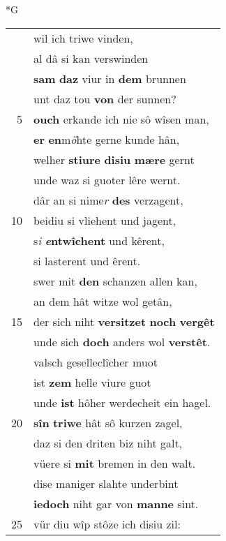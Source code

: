 \documentclass[8pt,a4paper,notitlepage]{article}
\begin{document}
\begin{table}[ht]
\begin{minipage}[t]{0.5\linewidth}
\end{minipage}
\end{table}
\newpage
\begin{table}[ht]
\begin{minipage}[t]{0.5\linewidth}
\small
\begin{center}*G
\end{center}
\begin{tabular}{rl}
 & wil ich triwe vinden,\\ 
 & al dâ si kan verswinden\\ 
 & \textbf{sam} \textbf{daz} viur in \textbf{dem} brunnen\\ 
 & unt daz tou \textbf{von} der sunnen?\\ 
5 & \textbf{ouch} erkande ich nie sô wîsen man,\\ 
 & \textbf{er} \textbf{en}m\textit{ö}hte gerne kunde hân,\\ 
 & welher \textbf{stiure} \textbf{disiu} \textbf{mære} gernt\\ 
 & unde waz si guoter lêre wernt.\\ 
 & dâr an si nime\textit{r} \textbf{des} verzagent,\\ 
10 & beidiu si vliehent und jagent,\\ 
 & s\textit{i} \textbf{\textit{e}ntwîchent} und kêrent,\\ 
 & si lasterent und êrent.\\ 
 & swer mit \textbf{den} schanzen allen kan,\\ 
 & an dem hât witze wol getân,\\ 
15 & der sich niht \textbf{versitzet} \textbf{noch} \textbf{vergêt}\\ 
 & unde sich \textbf{doch} anders wol \textbf{verstêt}.\\ 
 & valsch geselleclîcher muot\\ 
 & ist \textbf{z}\textbf{em} helle viure guot\\ 
 & unde \textbf{ist} hôher werdecheit ein hagel.\\ 
20 & \textbf{sîn} \textbf{triwe} hât sô kurzen zagel,\\ 
 & daz si den driten biz niht galt,\\ 
 & vüere si \textbf{mit} bremen in den walt.\\ 
 & dise maniger slahte underbint\\ 
 & \textbf{iedoch} niht gar von \textbf{manne} sint.\\ 
25 & vür diu wîp stôze ich disiu zil:\\ 

\end{tabular}
\end{minipage}
\end{table}
\end{document}
